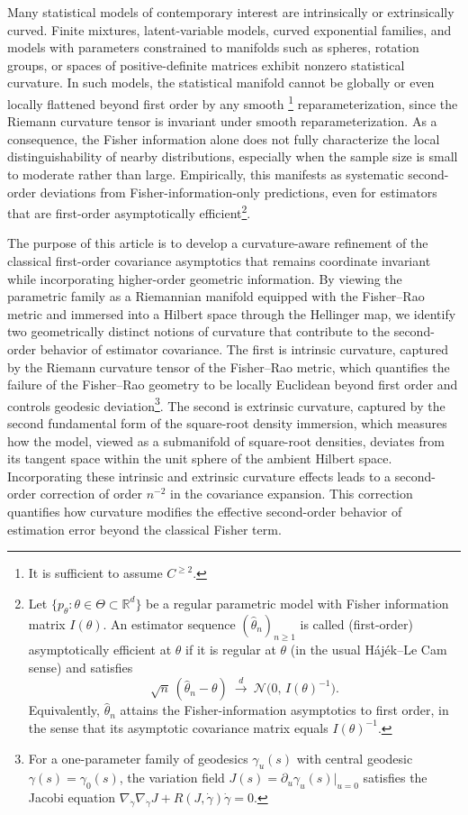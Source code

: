 \documentclass[11pt,letterpaper]{amsart}
\numberwithin{equation}{section}
\theoremstyle{plain}
\theoremstyle{definition}
\theoremstyle{remark}
\begin{document}
Many statistical models of contemporary interest are intrinsically or extrinsically curved. Finite mixtures, latent-variable models, curved exponential families, and models with parameters constrained to manifolds such as spheres, rotation groups, or spaces of positive-definite matrices exhibit nonzero statistical curvature. In such models, the statistical manifold cannot be globally or even locally flattened beyond first order by any smooth \footnote{It is sufficient to assume \(C^{\ge 2}\).} reparameterization, since the Riemann curvature tensor is invariant under smooth reparameterization. As a consequence, the Fisher information alone does not fully characterize the local distinguishability of nearby distributions, especially when the sample size is small to moderate rather than large. Empirically, this manifests as systematic second-order deviations from Fisher-information-only predictions, even for estimators that are first-order asymptotically efficient\footnote{Let \(\{p_\theta:\theta\in\Theta\subset\mathbb{R}^d\}\) be a regular parametric model with Fisher information matrix
\(I(\theta)\). An estimator sequence \((\hat\theta_n)_{n\ge 1}\) is called (first-order) asymptotically efficient at \(\theta\)
if it is regular at \(\theta\) (in the usual H\'aj\'ek--Le Cam sense) and satisfies
\[
\sqrt{n}\,(\hat\theta_n-\theta)\ \xrightarrow{d}\ \mathcal{N}\!\big(0,\,I(\theta)^{-1}\big).
\]
Equivalently, \(\hat\theta_n\) attains the Fisher-information asymptotics to first order, in the sense that its asymptotic
covariance matrix equals \(I(\theta)^{-1}\).
}.

The purpose of this article is to develop a curvature-aware refinement of the classical first-order covariance asymptotics that remains coordinate invariant while incorporating higher-order geometric information. By viewing the parametric family as a Riemannian manifold equipped with the Fisher--Rao metric and immersed into a Hilbert space through the Hellinger map, we identify two geometrically distinct notions of curvature that contribute to the second-order behavior of estimator covariance. The first is intrinsic curvature, captured by the Riemann curvature tensor of the Fisher--Rao metric, which quantifies the failure of the Fisher--Rao geometry to be locally Euclidean beyond first order and controls geodesic deviation\footnote{For a one-parameter family of geodesics \(\gamma_u(s)\) with central geodesic \(\gamma(s)=\gamma_0(s)\), the variation field \(J(s)=\partial_u\gamma_u(s)\vert_{u=0}\) satisfies the Jacobi equation \(\nabla_{\dot\gamma}\nabla_{\dot\gamma}J + R(J,\dot\gamma)\dot\gamma=0\).}. The second is extrinsic curvature, captured by the second fundamental form of the square-root density immersion, which measures how the model, viewed as a submanifold of square-root densities, deviates from its tangent space within the unit sphere of the ambient Hilbert space. Incorporating these intrinsic and extrinsic curvature effects leads to a second-order correction of order \(n^{-2}\) in the covariance expansion. This correction quantifies how curvature modifies the effective second-order behavior of estimation error beyond the classical Fisher term.
\end{document}
